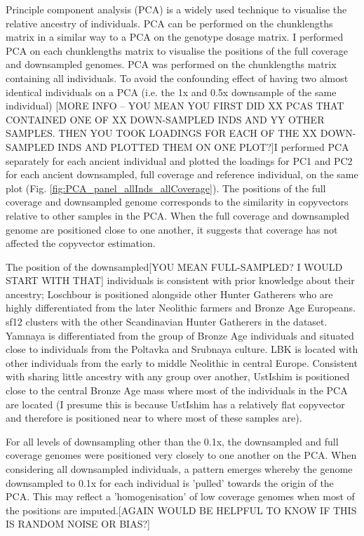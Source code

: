 Principle component analysis (PCA) is a widely used technique to visualise the relative ancestry of individuals. PCA can be performed on the chunklengths matrix in a similar way to a PCA on the genotype dosage matrix. I performed PCA on each chunklengths matrix to visualise the positions of the full coverage and downsampled genomes. PCA was performed on the chunklengths matrix containing all individuals. To avoid the confounding effect of having two almost identical individuals on a PCA (i.e. the 1x and 0.5x downsample of the same individual) {\color{red}[MORE INFO -- YOU MEAN YOU FIRST DID XX PCAS THAT CONTAINED ONE OF XX DOWN-SAMPLED INDS AND YY OTHER SAMPLES. THEN YOU TOOK LOADINGS FOR EACH OF THE XX DOWN-SAMPLED INDS AND PLOTTED THEM ON ONE PLOT?]}I performed PCA separately for each ancient individual and plotted the loadings for PC1 and PC2 for each ancient downsampled, full coverage and reference individual, on the same plot (Fig. \ref{fig:PCA_panel_allInds_allCoverage}). The positions of the full coverage and downsampled genome corresponds to the similarity in copyvectors relative to other samples in the PCA. When the full coverage and downsampled genome are positioned close to one another, it suggests that coverage has not affected the copyvector estimation. 

The position of the downsampled{\color{red}[YOU MEAN FULL-SAMPLED? I WOULD START WITH THAT]} individuals is consistent with prior knowledge about their ancestry; Loschbour is positioned alongside other Hunter Gatherers who are highly differentiated from the later {\color{red}N}eolithic farmers and Bronze Age Europeans. sf12 clusters with the other Scandinavian Hunter Gatherers in the dataset. Yamnaya is differentiated from the group of Bronze Age individuals and situated close to individuals from the Poltavka and Srubnaya culture. LBK is located with other individuals from the early to middle Neolithic in central Europe. Consistent with sharing little ancestry with any group over another, UstIshim is positioned close to the central Bronze Age mass where most of the individuals in the PCA are located (I presume this is because UstIshim has a relatively flat copyvector and therefore is positioned near to where most of these samples are). 

For all levels of downsampling other than the 0.1x, the downsampled and full coverage genomes were positioned very closely to one another on the PCA. When considering all downsampled individuals, a pattern emerges whereby the genome downsampled to 0.1x for each individual is 'pulled' towards the origin of the PCA. {\color{red}This may reflect a 'homogenisation' of low coverage genomes when most of the positions are imputed.[AGAIN WOULD BE HELPFUL TO KNOW IF THIS IS RANDOM NOISE OR BIAS?]}

